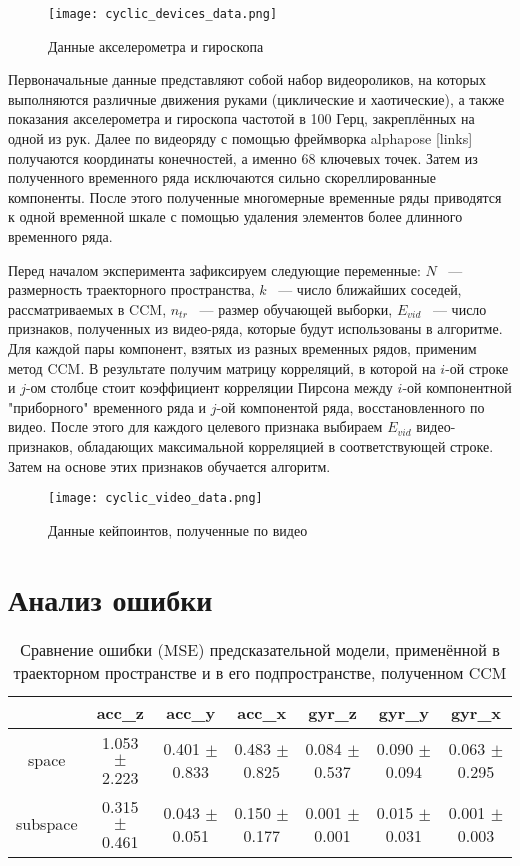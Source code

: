 \documentclass[a4paper, 12pt]{article}
\begin{document}
\begin{figure}[bhtp]
	\texttt{[image: cyclic\_devices\_data.png]}
	\caption{Данные акселерометра и гироскопа}
	\label{fig:devices_data}
\end{figure}
Первоначальные данные представляют собой набор видеороликов, на которых выполняются различные движения руками (циклические и хаотические), а также показания акселерометра и гироскопа частотой в 100 Герц, закреплённых на одной из рук. 
Далее по видеоряду с помощью фреймворка alphapose [links] получаются координаты конечностей, а именно 68 ключевых точек. 
Затем из полученного временного ряда исключаются сильно скореллированные компоненты.
После этого полученные многомерные временные ряды приводятся к одной временной шкале с помощью удаления элементов более длинного временного ряда.

Перед началом эксперимента зафиксируем следующие переменные: $N$ ~--- размерность траекторного пространства, $k$ ~--- число ближайших соседей, рассматриваемых в CCM, $n_{tr}$ ~--- размер обучающей выборки, $E_{vid}$ ~--- число признаков, полученных из видео-ряда, которые будут использованы в алгоритме.
Для каждой пары компонент, взятых из разных временных рядов, применим метод CCM.
В результате получим матрицу корреляций, в которой на $i\text{-ой}$ строке и $j\text{-ом}$ столбце стоит коэффициент корреляции Пирсона между $i\text{-ой}$ компонентной "приборного" временного ряда и $j\text{-ой}$ компонентой ряда, восстановленного по видео. 
После этого для каждого целевого признака выбираем $E_{vid}$ видео-признаков, обладающих максимальной корреляцией в соответствующей строке.
Затем на основе этих признаков обучается алгоритм.

\begin{figure}[bhtp]
	\texttt{[image: cyclic\_video\_data.png]}
	\caption{Данные кейпоинтов, полученные по видео}
	\label{fig:video_data}
\end{figure}

\section{Анализ ошибки}
\begin{table}[bhtp]
	\centering
	\caption{Сравнение ошибки (MSE) предсказательной модели, применённой в траекторном пространстве и в его подпространстве, полученном CCM}
	\label{tbl:space_and_subspace}
	\begin{tabular}{c|cccccc}
		\hline
		& acc\_z & acc\_y & acc\_x & gyr\_z & gyr\_y & gyr\_x \\
		\hline
		space & 1.053 $\pm$ 2.223 & 0.401 $\pm$ 0.833 & 0.483 $\pm$ 0.825 & 0.084 $\pm$ 0.537 & 0.090 $\pm$ 0.094 & 0.063 $\pm$ 0.295 \\
		subspace & 0.315 $\pm$ 0.461 & 0.043 $\pm$ 0.051 & 0.150 $\pm$ 0.177 & 0.001 $\pm$ 0.001	& 0.015 $\pm$ 0.031 & 0.001 $\pm$ 0.003 \\
		\hline
	\end{tabular}
\end{table}
\end{document}
